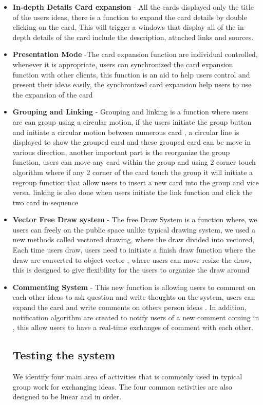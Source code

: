 \documentclass{sigchi}
\begin{document}
\begin{itemize}
\begin{itemize}
\item  \textbf{In-depth Details Card expansion}   - All the cards displayed only the title of the users ideas, there is a function to expand the card details by double clicking on the card, This will trigger a windows that display all of the in-depth details of the card include the description, attached links and sources. 
\item  \textbf{Presentation Mode} -The card expansion function are individual controlled, whenever it is appropriate, users can synchronized the card expansion function with other clients, this function is an aid to help users control and present their ideas easily, the synchronized card expansion help users to use the expansion of the card 
\item \textbf{Grouping and Linking} -  Grouping and linking is a function where users are can group using a circular motion, if the users initiate the group button and initiate a circular motion between numerous card , a circular line is displayed to show the grouped card and these grouped card can be move in various direction, another important part is the reorganize the group function, users can move any card within the group and using 2 corner touch algorithm where if any 2 corner of the card touch the group it will initiate  a regroup function that allow users to insert a new card into the group and vice versa. linking is also done when users initiate the link function and click the two card in sequence  
\item \textbf{Vector Free Draw system} - The free Draw System is a function where, we users can freely on the public space unlike typical drawing system, we used a new methods called vectored drawing, where the draw divided into vectored, Each time users draw, users need to initiate a finish draw function where the draw are converted to object vector , where users can move resize the draw, this is designed to give flexibility for the users to organize the draw around 
\item \textbf{Commenting System} - This new function is allowing users to comment on each other ideas to ask question and write  thoughts on the system, users can expand the card and write comments on others person ideas . In addition, notification algorithm are created to notify users of a new comment coming in , this allow users to have a real-time exchanges of comment with each other. 



\subsection{Testing the system}
We identify four main area of activities  that is commonly used  in typical group work for exchanging ideas. The four common activities are also designed to be linear and in order. 


\end{itemize}
\end{itemize}
\end{document}

